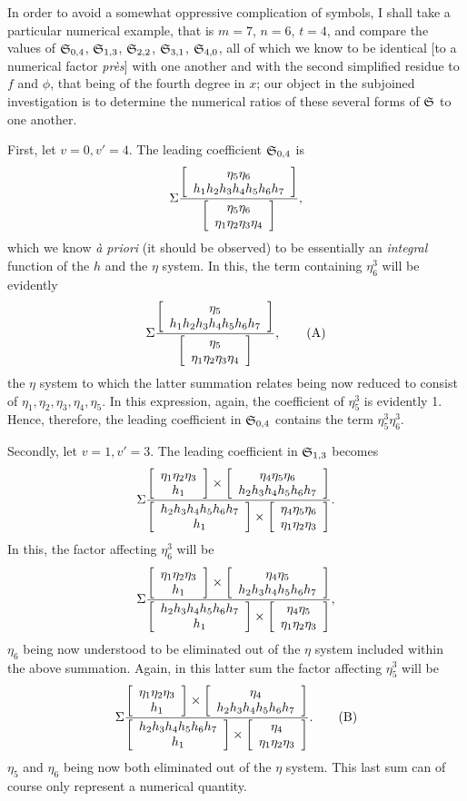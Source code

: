 \documentclass[11pt]{article}
\newcommand{\sourcepage}[1]{\marginpar{\scriptsize p.~#1}}
\begin{document}
In order to avoid a somewhat oppressive complication of symbols, I shall take a particular numerical example, that is $m=7$, $n=6$, $t=4$, and compare the values of $\mathfrak{S}_{0,4}$, $\mathfrak{S}_{1,3}$, $\mathfrak{S}_{2,2}$, $\mathfrak{S}_{3,1}$, $\mathfrak{S}_{4,0}$, all of which we know to be identical [to a numerical factor \emph{près}] with one another and with the second simplified residue to $f$ and $\phi$, that being of the fourth degree in $x$; our object in the subjoined investigation is to determine the numerical ratios of these several forms of $\mathfrak{S}$ to one another.

First, let $v=0,v'=4$. The leading coefficient $\mathfrak{S}_{0,4}$ is
\[
\Sigma\frac{\left[\begin{array}{c}\eta_5\eta_6\\h_1h_2h_3h_4h_5h_6h_7\end{array}\right]}{\left[\begin{array}{c}\eta_5\eta_6\\\eta_1\eta_2\eta_3\eta_4\end{array}\right]},
\]
which we know \emph{à priori} (it should be observed) to be essentially an \emph{integral} function of the $h$ and the $\eta$ system. In this, the term containing $\eta_6^3$ will be evidently
\[
\Sigma\frac{\left[\begin{array}{c}\eta_5\\h_1h_2h_3h_4h_5h_6h_7\end{array}\right]}{\left[\begin{array}{c}\eta_5\\\eta_1\eta_2\eta_3\eta_4\end{array}\right]},\tag{A}
\]
the $\eta$ system to which the latter summation relates being now reduced to consist of $\eta_1,\eta_2,\eta_3,\eta_4,\eta_5$. In this expression, again, the coefficient of $\eta_5^3$ is evidently 1. Hence, therefore, the leading coefficient in $\mathfrak{S}_{0,4}$ contains the term $\eta_5^3\eta_6^3$.

\sourcepage{472}
Secondly, let $v=1,v'=3$. The leading coefficient in $\mathfrak{S}_{1,3}$ becomes
\[
\Sigma\frac{
\left[\begin{array}{c}\eta_1\eta_2\eta_3\\h_1\end{array}\right]\times\left[\begin{array}{c}\eta_4\eta_5\eta_6\\h_2h_3h_4h_5h_6h_7\end{array}\right]
}{
\left[\begin{array}{c}h_2h_3h_4h_5h_6h_7\\h_1\end{array}\right]\times\left[\begin{array}{c}\eta_4\eta_5\eta_6\\\eta_1\eta_2\eta_3\end{array}\right]
}.
\]
In this, the factor affecting $\eta_6^3$ will be
\[
\Sigma\frac{
\left[\begin{array}{c}\eta_1\eta_2\eta_3\\h_1\end{array}\right]\times\left[\begin{array}{c}\eta_4\eta_5\\h_2h_3h_4h_5h_6h_7\end{array}\right]
}{
\left[\begin{array}{c}h_2h_3h_4h_5h_6h_7\\h_1\end{array}\right]\times\left[\begin{array}{c}\eta_4\eta_5\\\eta_1\eta_2\eta_3\end{array}\right]
},
\]
$\eta_6$ being now understood to be eliminated out of the $\eta$ system included within the above summation. Again, in this latter sum the factor affecting $\eta_5^3$ will be
\[
\Sigma\frac{
\left[\begin{array}{c}\eta_1\eta_2\eta_3\\h_1\end{array}\right]\times\left[\begin{array}{c}\eta_4\\h_2h_3h_4h_5h_6h_7\end{array}\right]
}{
\left[\begin{array}{c}h_2h_3h_4h_5h_6h_7\\h_1\end{array}\right]\times\left[\begin{array}{c}\eta_4\\\eta_1\eta_2\eta_3\end{array}\right]
}.\tag{B}
\]
$\eta_5$ and $\eta_6$ being now both eliminated out of the $\eta$ system. This last sum can of course only represent a numerical quantity.
\end{document}
